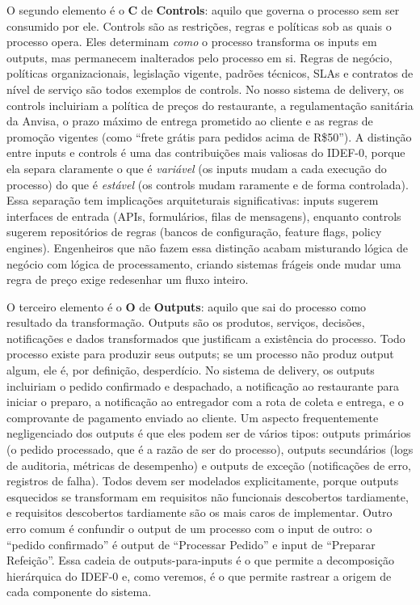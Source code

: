 O segundo elemento é o \textbf{C} de \textbf{Controls}: aquilo que governa o
processo sem ser consumido por ele. Controls são as restrições, regras e políticas
sob as quais o processo opera. Eles determinam \emph{como} o processo transforma os
inputs em outputs, mas permanecem inalterados pelo processo em si. Regras de negócio,
políticas organizacionais, legislação vigente, padrões técnicos, SLAs e contratos de
nível de serviço são todos exemplos de controls. No nosso sistema de delivery, os
controls incluiriam a política de preços do restaurante, a regulamentação sanitária
da Anvisa, o prazo máximo de entrega prometido ao cliente e as regras de promoção
vigentes (como ``frete grátis para pedidos acima de R\$50''). A distinção entre
inputs e controls é uma das contribuições mais valiosas do IDEF-0, porque ela
separa claramente o que é \emph{variável} (os inputs mudam a cada execução do
processo) do que é \emph{estável} (os controls mudam raramente e de forma
controlada). Essa separação tem implicações arquiteturais significativas: inputs sugerem
interfaces de entrada (APIs, formulários, filas de mensagens), enquanto controls
sugerem repositórios de regras (bancos de configuração, feature flags, policy
engines). Engenheiros que não fazem essa distinção acabam misturando lógica de
negócio com lógica de processamento, criando sistemas frágeis onde mudar uma regra
de preço exige redesenhar um fluxo inteiro.

O terceiro elemento é o \textbf{O} de \textbf{Outputs}: aquilo que sai do processo
como resultado da transformação. Outputs são os produtos, serviços, decisões,
notificações e dados transformados que justificam a existência do processo. Todo
processo existe para produzir seus outputs; se um processo não produz output algum,
ele é, por definição, desperdício. No sistema de delivery, os outputs incluiriam o
pedido confirmado e despachado, a notificação ao restaurante para iniciar o preparo,
a notificação ao entregador com a rota de coleta e entrega, e o comprovante de
pagamento enviado ao cliente. Um aspecto frequentemente negligenciado dos outputs é
que eles podem ser de vários tipos: outputs primários (o pedido processado, que é a
razão de ser do processo), outputs secundários (logs de auditoria, métricas de
desempenho) e outputs de exceção (notificações de erro, registros de falha). Todos
devem ser modelados explicitamente, porque outputs esquecidos se transformam em
requisitos não funcionais descobertos tardiamente, e requisitos descobertos
tardiamente são os mais caros de implementar. Outro erro comum é confundir o output
de um processo com o input de outro: o ``pedido confirmado'' é output de ``Processar
Pedido'' e input de ``Preparar Refeição''. Essa cadeia de outputs-para-inputs é
o que permite a decomposição hierárquica do IDEF-0 e, como veremos,
é o que permite rastrear a origem de cada componente do sistema.

